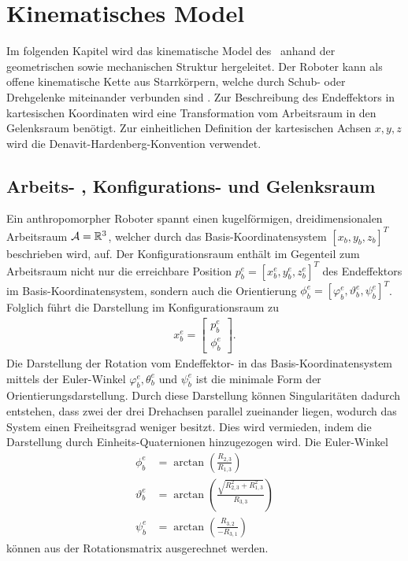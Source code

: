 %
\chapter{Kinematisches Model}
%
Im folgenden Kapitel wird das kinematische Model des \kuka \ anhand der geometrischen sowie mechanischen Struktur hergeleitet. Der Roboter kann als offene kinematische Kette aus Starrkörpern, welche durch Schub- oder Drehgelenke miteinander verbunden sind \cite{Siciliano:2008:RMP:1524151}. Zur Beschreibung des Endeffektors in kartesischen Koordinaten wird eine Transformation vom Arbeitsraum in den Gelenksraum benötigt.  Zur einheitlichen Definition der kartesischen Achsen $x,y,z$ wird die Denavit-Hardenberg-Konvention verwendet. 

\section{Arbeits- , Konfigurations- und Gelenksraum}
Ein anthropomorpher Roboter spannt einen kugelförmigen, dreidimensionalen Arbeitsraum $\mathcal{A} = \mathbb{R}^3 $, welcher durch das Basis-Koordinatensystem $[x_b,y_b,z_b]^T$ beschrieben wird, auf. Der Konfigurationsraum enthält im Gegenteil zum Arbeitsraum nicht nur die erreichbare Position $p_b^e = [x_b^e, y_b^e, z_b^e]^T$ des Endeffektors im Basis-Koordinatensystem, sondern auch die Orientierung $\phi_b^e = [\varphi_b^e, \vartheta_b^e, \psi_b^e]^T$. Folglich führt die Darstellung im Konfigurationsraum zu 
\begin{align}
x_b^e = 
\begin{bmatrix}
p_b^e \\
\phi_b^e
\end{bmatrix}.
\end{align}
Die Darstellung der Rotation vom Endeffektor- in das Basis-Koordinatensystem mittels der Euler-Winkel $\varphi_b^e, \theta_b^e$ und $\psi_b^e$ ist die minimale Form der Orientierungsdarstellung. Durch diese Darstellung können Singularitäten dadurch entstehen, dass zwei der drei Drehachsen parallel zueinander liegen, wodurch das System einen Freiheitsgrad weniger besitzt. Dies wird vermieden, indem die Darstellung durch Einheits-Quaternionen hinzugezogen wird. Die Euler-Winkel 
\begin{align}
\phi_b^e &= \arctan \left( \frac{R_{2,3}}{R_{1,3}} \right) \\
\vartheta_b^e &= \arctan \left( \frac{\sqrt{R_{2,3}^2 + R_{1,3}^2} }{R_{3,3}}\right) \\
\psi_b^e &= \arctan \left( \frac{R_{3,2}}{-R_{3,1}} \right)
\end{align}
können aus der Rotationsmatrix ausgerechnet werden. \\

